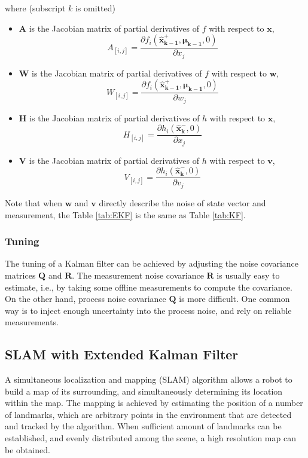 \noindent where (subscript $k$ is omitted)
\begin{itemize}
  \item $\boldsymbol{A}$ is the Jacobian matrix of partial derivatives of $f$ with
  respect to $\boldsymbol{x}$, 
\begin{equation}A_{[i,j]}= \frac{\partial f_i(\boldsymbol{\hat{x}_{k-1}^+},
    \boldsymbol{\mu_{k-1}}, 0)}{\partial x_j}\end{equation}
  \item $\boldsymbol{W}$ is the Jacobian matrix of partial derivatives of $f$ with
  respect to $\boldsymbol{w}$, 
\begin{equation}W_{[i,j]}= \frac{\partial f_i(\boldsymbol{\hat{x}_{k-1}^+},
    \boldsymbol{\mu_{k-1}}, 0)}{\partial w_j}\end{equation}
  \item $\boldsymbol{H}$ is the Jacobian matrix of partial derivatives of $h$ with
  respect to $\boldsymbol{x}$, 
\begin{equation}H_{[i,j]}= \frac{\partial h_i(\boldsymbol{\hat{x}_k^-},
    0)}{\partial x_j}\end{equation}
  \item $\boldsymbol{V}$ is the Jacobian matrix of partial derivatives of $h$ with
  respect to $\boldsymbol{v}$, 
\begin{equation}V_{[i,j]}= \frac{\partial
    h_i(\boldsymbol{\hat{x}_k^-},0)}{\partial v_j}\end{equation}
\end{itemize}

\noindent Note that when $\boldsymbol{w}$ and $\boldsymbol{v}$ directly describe the noise of
state vector and measurement, the Table \ref{tab:EKF} is the same as
Table \ref{tab:KF}.

\subsubsection{Tuning}
The tuning of a Kalman filter can be achieved by adjusting the noise
covariance matrices $\boldsymbol{Q}$ and $\boldsymbol{R}$. The
measurement noise covariance $\boldsymbol{R}$ is usually easy to
estimate, i.e., by taking some offline measurements to compute the
covariance. On the other hand, process noise covariance
$\boldsymbol{Q}$ is more difficult. One common way is to inject enough
uncertainty into the process noise, and rely on reliable measurements.
 
\subsection{SLAM with Extended Kalman Filter}
A simultaneous localization and mapping (SLAM) algorithm allows a
robot to build a map of its surrounding, and simultaneously
determining its location within the map. The mapping is achieved by
estimating the position of a number of landmarks, which are arbitrary
points in the environment that are detected and tracked by the
algorithm. When sufficient amount of landmarks can be established, and
evenly distributed among the scene, a high resolution map can be
obtained. 

